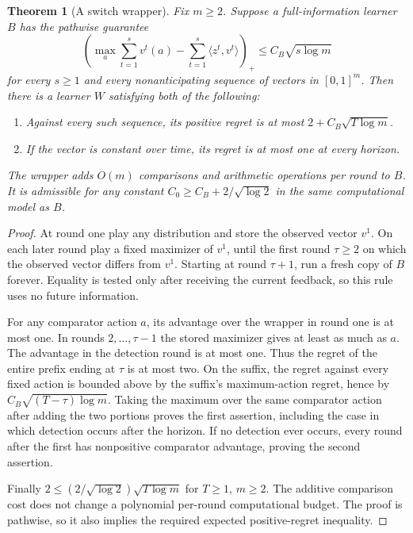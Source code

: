 \documentclass[11pt]{article}
\newtheorem{theorem}{Theorem}
\theoremstyle{definition}
\theoremstyle{remark}
\begin{document}
\begin{theorem}[A switch wrapper]
Fix $m\geq2$. Suppose a full-information learner $B$ has the pathwise guarantee
\[
 \left(\max_a\sum_{t=1}^{s}v^t(a)-\sum_{t=1}^{s}\langle z^t,v^t\rangle\right)_+
 \leq C_B\sqrt{s\log m}
\]
for every $s\geq1$ and every nonanticipating sequence of vectors in $[0,1]^m$. Then there is a learner $W$ satisfying both of the following:
\begin{enumerate}
\item Against every such sequence, its positive regret is at most $2+C_B\sqrt{T\log m}$.
\item If the vector is constant over time, its regret is at most one at every horizon.
\end{enumerate}
The wrapper adds $O(m)$ comparisons and arithmetic operations per round to $B$. It is admissible for any constant $C_0\geq C_B+2/\sqrt{\log 2}$ in the same computational model as $B$.
\end{theorem}
\begin{proof}
At round one play any distribution and store the observed vector $v^1$. On each later round play a fixed maximizer of $v^1$, until the first round $\tau\geq2$ on which the observed vector differs from $v^1$. Starting at round $\tau+1$, run a fresh copy of $B$ forever. Equality is tested only after receiving the current feedback, so this rule uses no future information.

For any comparator action $a$, its advantage over the wrapper in round one is at most one. In rounds $2,\ldots,\tau-1$ the stored maximizer gives at least as much as $a$. The advantage in the detection round is at most one. Thus the regret of the entire prefix ending at $\tau$ is at most two. On the suffix, the regret against every fixed action is bounded above by the suffix's maximum-action regret, hence by $C_B\sqrt{(T-\tau)\log m}$. Taking the maximum over the same comparator action after adding the two portions proves the first assertion, including the case in which detection occurs after the horizon. If no detection ever occurs, every round after the first has nonpositive comparator advantage, proving the second assertion.

Finally $2\leq(2/\sqrt{\log2})\sqrt{T\log m}$ for $T\geq1$, $m\geq2$. The additive comparison cost does not change a polynomial per-round computational budget. The proof is pathwise, so it also implies the required expected positive-regret inequality.
\end{proof}
\end{document}
